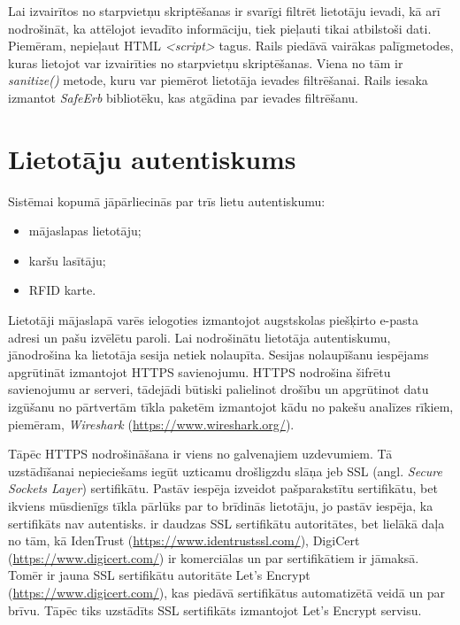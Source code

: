 Lai izvairītos no starpvietņu skriptēšanas ir svarīgi filtrēt lietotāju ievadi, kā arī nodrošināt, ka attēlojot ievadīto informāciju, tiek pieļauti tikai atbilstoši dati. Piemēram, nepieļaut HTML \textit{<script>} tagus.
Rails piedāvā vairākas palīgmetodes, kuras lietojot var izvairīties no starpvietņu skriptēšanas. Viena no tām ir \textit{sanitize()} metode, kuru var piemērot lietotāja ievades filtrēšanai. Rails iesaka izmantot \textit{SafeErb} bibliotēku, kas atgādina par ievades filtrēšanu.

\section{Lietotāju autentiskums}
Sistēmai kopumā jāpārliecinās par trīs lietu autentiskumu:
\begin{itemize}
	\item mājaslapas lietotāju;
	\item karšu lasītāju;
	\item RFID karte.
\end{itemize}
Lietotāji mājaslapā varēs ielogoties izmantojot augstskolas piešķirto e-pasta adresi un pašu izvēlētu paroli. Lai nodrošinātu lietotāja autentiskumu, jānodrošina ka lietotāja sesija netiek nolaupīta. Sesijas nolaupīšanu iespējams apgrūtināt izmantojot HTTPS savienojumu. HTTPS nodrošina šifrētu savienojumu ar serveri, tādejādi būtiski palielinot drošību un apgrūtinot datu izgūšanu no pārtvertām tīkla paketēm izmantojot kādu no pakešu analīzes rīkiem, piemēram, \textit{Wireshark} (\url{https://www.wireshark.org/}).

Tāpēc HTTPS nodrošināšana ir viens no galvenajiem uzdevumiem. Tā uzstādīšanai nepieciešams iegūt uzticamu drošligzdu slāņa jeb SSL (angl. \textit{Secure Sockets Layer}) sertifikātu. Pastāv iespēja izveidot pašparakstītu sertifikātu, bet ikviens mūsdienīgs tīkla pārlūks par to brīdinās lietotāju, jo pastāv iespēja, ka sertifikāts nav autentisks. ir daudzas SSL sertifikātu autoritātes, bet lielākā daļa no tām, kā IdenTrust (\url{https://www.identrustssl.com/}), DigiCert (\url{https://www.digicert.com/}) ir komerciālas un par sertifikātiem ir jāmaksā. Tomēr ir jauna SSL sertifikātu autoritāte Let's Encrypt (\url{https://www.digicert.com/}), kas piedāvā sertifikātus automatizētā veidā un par brīvu. Tāpēc tiks uzstādīts SSL sertifikāts izmantojot Let's Encrypt servisu.

